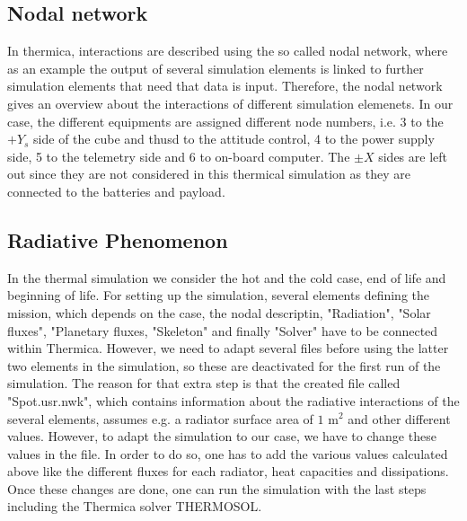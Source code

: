 \subsection{Nodal network}
In thermica, interactions are described using the so called nodal network, where as an example the output of several simulation elements is linked to further simulation elements that need that data is input. Therefore, the nodal network gives an overview about the interactions of different simulation elemenets. In our case, the different equipments are assigned different node numbers, i.e. 3 to the $+Y_{s}$ side of the cube and thusd to the attitude control, 4 to the power supply side,  5 to the telemetry side and 6 to on-board computer. The $\pm X$ sides are left out since they are not considered in this thermical simulation as they are connected to the batteries and payload.

\subsection{Radiative Phenomenon}
In the thermal simulation we consider the hot and the cold case, end of life and beginning of life. For setting up the simulation, several elements defining the mission, which depends on the case, the nodal descriptin, "Radiation", "Solar fluxes", "Planetary fluxes, "Skeleton" and finally "Solver" have to be connected within Thermica. However, we need to adapt several files before using the latter two elements in the simulation, so these are deactivated for the first run of the simulation.  
The reason for that extra step is that the created file called "Spot.usr.nwk", which contains information about the radiative interactions of the several elements, assumes e.g. a radiator surface area of $1$ m$^{2}$ and other different values. However, to adapt the simulation to our case, we have to change these values in the file. In order to do so, one has to add the various values calculated above like the different fluxes for each radiator, heat capacities and dissipations. Once these changes are done, one can run the simulation with the last steps including the Thermica solver THERMOSOL.

